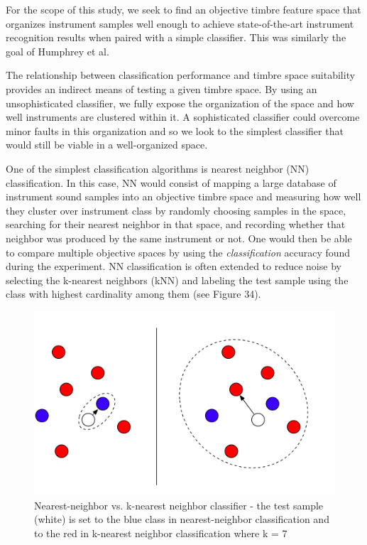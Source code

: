 \documentclass[12pt]{report} 	%
\numberwithin{figure}{chapter}
\numberwithin{table}{chapter}
\numberwithin{equation}{chapter}
\begin{document}
\begin{flushleft}
For the scope of this study, we seek to find an objective timbre feature space that organizes instrument samples well enough to achieve state-of-the-art instrument recognition results when paired with a simple classifier. This was similarly the goal of Humphrey et al.

The relationship between classification performance and timbre space suitability provides an indirect means of testing a given timbre space. By using an unsophisticated classifier, we fully expose the organization of the space and how well instruments are clustered within it. A sophisticated classifier could overcome minor faults in this organization and so we look to the simplest classifier that would still be viable in a well-organized space.

One of the simplest classification algorithms is nearest neighbor (NN) classification. In this case, NN would consist of mapping a large database of instrument sound samples into an objective timbre space and measuring how well they cluster over instrument class by randomly choosing samples in the space, searching for their nearest neighbor in that space, and recording whether that neighbor was produced by the same instrument or not. One would then be able to compare multiple objective spaces by using the \textit{classification} accuracy found during the experiment. NN classification is often extended to reduce noise by selecting the k-nearest neighbors (kNN) and labeling the test sample using the class with highest cardinality among them (see Figure 34).
\begin{figure}[h!]
\begin{center}
\includegraphics[scale=0.5]{NearestNeighbor}
\caption[Nearest-neighbor vs. k-nearest-neighbor classifier]{Nearest-neighbor vs. k-nearest neighbor classifier - the test sample (white) is set to the blue class in nearest-neighbor classification and to the red in k-nearest neighbor classification where k = 7}
\end{center}
\end{figure}


\end{flushleft}
\end{document}
